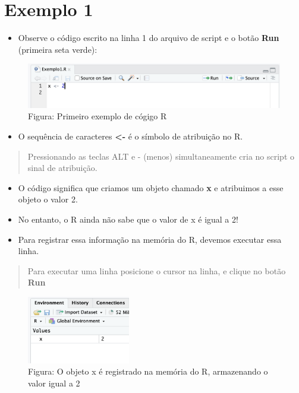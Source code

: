 \documentclass[
]{book}
\providecommand{\tightlist}{%
  \setlength{\itemsep}{0pt}\setlength{\parskip}{0pt}}
\begin{document}
\section{Exemplo 1}\label{exemplo-1}

\begin{itemize}
\tightlist
\item
  Observe o código escrito na linha 1 do arquivo de script e o botão \textbf{Run} (primeira seta verde):
\end{itemize}

\begin{figure}
\centering
\includegraphics{telaExemplo1.png}
\caption{Figura: Primeiro exemplo de cógigo R}
\end{figure}

\begin{itemize}
\tightlist
\item
  O sequência de caracteres \textbf{\textless-} é o símbolo de atribuição no R.
\end{itemize}

\begin{quote}
Pressionando as teclas ALT e - (menos) simultaneamente cria no script o sinal de atribuição.
\end{quote}

\begin{itemize}
\item
  O código significa que criamos um objeto chamado \textbf{x} e atribuimos a esse objeto o valor 2.
\item
  No entanto, o R ainda não sabe que o valor de x é igual a 2!
\item
  Para registrar essa informação na memória do R, devemos executar essa linha.
\end{itemize}

\begin{quote}
Para executar uma linha posicione o cursor na linha, e clique no botão \textbf{Run}
\end{quote}

\begin{figure}
\centering
\includegraphics[width=0.4\textwidth,height=\textheight]{telaValorMemoria.png}
\caption{Figura: O objeto x é registrado na memória do R, armazenando o valor igual a 2}
\end{figure}
\end{document}
